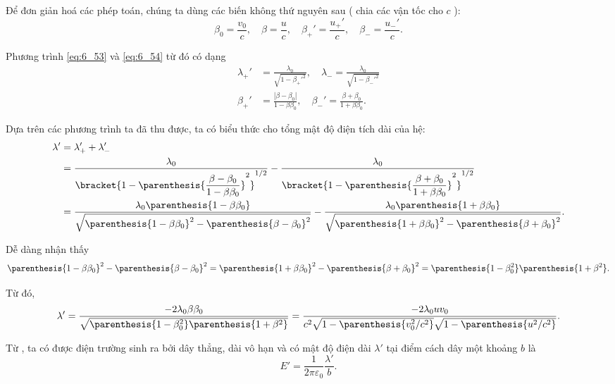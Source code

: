 Để đơn giản hoá các phép toán, chúng ta dùng các biến không thứ nguyên sau ( chia các vận tốc cho $c$ ):
\begin{equation*}
    \beta_0 = \frac{v_0}{c},\quad \beta = \frac{u}{c},\quad \beta_+' = \frac{u_+'}{c},\quad \beta_- = \frac{u_-'}{c}.
\end{equation*}

\noindent
Phương trình \eqref{eq:6_53} và \eqref{eq:6_54} từ đó có dạng
\begin{align}
    \lambda_+' &= \frac{\lambda_0}{\sqrt{1 - \beta_+'^2}},\quad \lambda_- = \frac{\lambda_0}{\sqrt{1 - \beta_-'^2}} \label{eq:6_55}\\
    \beta_+' &= \frac{|\beta - \beta_0|}{1 - \beta \beta_0},\quad \beta_-' = \frac{\beta + \beta_0}{1 + \beta \beta_0}.
\end{align}

\noindent 
Dựa trên các phương trình ta đã thu được, ta có biểu thức cho tổng mật độ điện tích dài của hệ:
\begin{align*}
    \lambda' &= \lambda_+' + \lambda_-'\\
    &= \frac{\lambda_0}{\bracket{ 1 - \parenthesis{ \dfrac{\beta-\beta_0}{1-\beta\beta_0} }^2}^{1/2}} - \frac{\lambda_0}{\bracket{ 1 - \parenthesis{ \dfrac{\beta+\beta_0}{1+\beta\beta_0} }^2}^{1/2}}\\
    &= \frac{\lambda_0 \parenthesis{1-\beta\beta_0}}{\sqrt{\parenthesis{1-\beta\beta_0}^2 - \parenthesis{\beta-\beta_0}^2}} - \frac{\lambda_0 \parenthesis{1+\beta\beta_0}}{\sqrt{\parenthesis{1+\beta\beta_0}^2 - \parenthesis{\beta+\beta_0}^2}}.
\end{align*}

\noindent
Dễ dàng nhận thấy 
\begin{equation*}
    \parenthesis{1-\beta\beta_0}^2 - \parenthesis{\beta-\beta_0}^2 = \parenthesis{1+\beta\beta_0}^2 - \parenthesis{\beta+\beta_0}^2 = \parenthesis{1-\beta_0^2} \parenthesis{1+\beta^2}.
\end{equation*}

\noindent
Từ đó,
\begin{equation}\label{eq:6_57}
    \lambda' = \frac{-2 \lambda_0 \beta \beta_0}{\sqrt{\parenthesis{1-\beta_0^2} \parenthesis{1+\beta^2}}} = \frac{-2 \lambda_0 u v_0}{c^2 \sqrt{1 - \parenthesis{v_0^2/c^2}} \sqrt{1 - \parenthesis{u^2/c^2}}}.
\end{equation}

Từ , ta có được điện trường sinh ra bởi dây thẳng, dài vô hạn và có mật độ điện dài $\lambda'$ tại điểm cách dây một khoảng $b$ là
\begin{equation*}
    E' = \frac{1}{2\pi\varepsilon_0} \frac{\lambda'}{b}.
\end{equation*}

